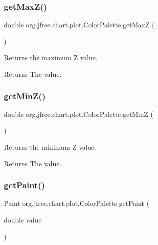 \subsubsection{\texorpdfstring{get\+Max\+Z()}{getMaxZ()}}
{\footnotesize\ttfamily double org.\+jfree.\+chart.\+plot.\+Color\+Palette.\+get\+MaxZ (\begin{DoxyParamCaption}{ }\end{DoxyParamCaption})}

Returns the maximum Z value.

\begin{DoxyReturn}{Returns}
The value. 
\end{DoxyReturn}
\mbox{\label{classorg_1_1jfree_1_1chart_1_1plot_1_1_color_palette_a00ea2c2fc54cc8049467c66b14647741}} 
\subsubsection{\texorpdfstring{get\+Min\+Z()}{getMinZ()}}
{\footnotesize\ttfamily double org.\+jfree.\+chart.\+plot.\+Color\+Palette.\+get\+MinZ (\begin{DoxyParamCaption}{ }\end{DoxyParamCaption})}

Returns the minimum Z value.

\begin{DoxyReturn}{Returns}
The value. 
\end{DoxyReturn}
\mbox{\label{classorg_1_1jfree_1_1chart_1_1plot_1_1_color_palette_a7d4758d9e1df336cb3e6a31ff2a4e920}} 
\subsubsection{\texorpdfstring{get\+Paint()}{getPaint()}}
{\footnotesize\ttfamily Paint org.\+jfree.\+chart.\+plot.\+Color\+Palette.\+get\+Paint (\begin{DoxyParamCaption}\item[{double}]{value }\end{DoxyParamCaption})}

